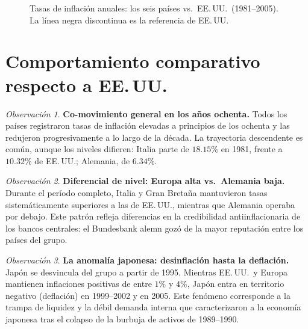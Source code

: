 \documentclass[12pt, letterpaper]{article}
\theoremstyle{remark}
\newtheorem{obs}{Observaci\'on}
\begin{document}
\begin{figure}[htbp]
\caption{Tasas de inflaci\'on anuales: los seis pa\'ises vs.\ EE.\,UU.\ (1981--2005).
  La l\'inea negra discontinua es la referencia de EE.\,UU.}
\end{figure}

\section{Comportamiento comparativo respecto a EE.\,UU.}

\begin{obs}
  \textbf{Co-movimiento general en los a\~nos ochenta.} Todos los pa\'ises
  registraron tasas de inflaci\'on elevadas a principios de los ochenta
  y las redujeron progresivamente a lo largo de la d\'ecada. La trayectoria
  descendente es com\'un, aunque los niveles difieren: Italia parte de
  $18.15\%$ en 1981, frente a $10.32\%$ de EE.\,UU.; Alemania, de $6.34\%$.
\end{obs}

\begin{obs}
  \textbf{Diferencial de nivel: Europa alta vs.\ Alemania baja.}
  Durante el per\'iodo completo, Italia y Gran Breta\~na mantuvieron
  tasas sistem\'aticamente superiores a las de EE.\,UU., mientras que
  Alemania operaba por debajo. Este patr\'on refleja diferencias en la
  credibilidad antiinflacionaria de los bancos centrales: el Bundesbank
  alemn goz\'o de la mayor reputaci\'on entre los pa\'ises del grupo.
\end{obs}

\begin{obs}
  \textbf{La anomal\'ia japonesa: desinflaci\'on hasta la deflaci\'on.}
  Jap\'on se desvincula del grupo a partir de 1995. Mientras EE.\,UU.\
  y Europa mantienen inflaciones positivas de entre $1\%$ y $4\%$, Jap\'on
  entra en territorio negativo (deflaci\'on) en 1999--2002 y en 2005.
  Este fen\'omeno corresponde a la trampa de liquidez y la d\'ebil demanda
  interna que caracterizaron a la econom\'ia japonesa tras el colapso de
  la burbuja de activos de 1989--1990.
\end{obs}
\end{document}
